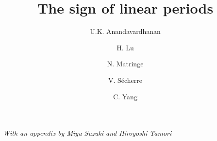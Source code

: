 \documentclass[11pt,letterpaper]{amsart}
\theoremstyle{plain}
\numberwithin{equation}{section}
\begin{document}
	
	\title{The sign of linear periods} 
	
	\author{U.K. Anandavardhanan}
	\address{U.K. Anandavardhanan. Department of Mathematics, Indian Institute of Technology Bombay, Powai, Mumbai, 400076, India}
	
	\author{H. Lu}
	\address{Hengfei Lu. School of Mathematical Sciences, Beihang University, 9 Nanshan Street, Shahe Higher Education Park, Changping, Beijing, 102206, China}
	
	\author{N. Matringe}
	\address{Nadir Matringe. Institute of Mathematical Sciences, NYU Shanghai, 3663 Zhongshan Road North Shanghai, 200062, China and
		Institut de Math\'ematiques de Jussieu-Paris Rive Gauche, Universit\'e Paris Cit\'e, 75205, Paris, France}
	
	\author{V. S\'echerre}
	\address{Vincent S\'echerre. Laboratoire de Math\'ematiques de Versailles, UVSQ, CNRS, Universit\'e Paris-Saclay, 78035, Versailles, France}
	
	\author{C. Yang}
	\address{Chang Yang. Key Laboratory of High Performance Computing and Stochastic Information Processing (HPC- SIP), School of Mathematics and Statistics, Hunan Normal University, Changsha, 410081, China}
	
	\address{Miyu Suzuki. Department of Mathematics, Kyoto University, Kitashirakawa Oiwake-cho, Sakyo-ku, Kyoto 606-8502, Japan}
	
	\address{Hiroyoshi Tamori. Department of Mathematical Sciences, Shibaura Institute of Technology, 307 Fukasaku, Minuma-ku, Saitama City, Saitama, 337-8570, Japan}
	
	\maketitle
	
	\begin{center}\textit{With an appendix by Miyu Suzuki and Hiroyoshi Tamori}\end{center}
	
\end{document}
